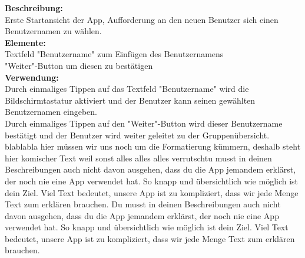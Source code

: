 \textbf{Beschreibung:}\\
Erste Startansicht der App, Aufforderung an den neuen Benutzer sich einen Benutzernamen zu wählen.\\
\textbf{Elemente:}\\
Textfeld "Benutzername" zum Einfügen des Benutzernamens\\
"Weiter"-Button um diesen zu bestätigen\\
\textbf{Verwendung:}\\
Durch einmaliges Tippen auf das Textfeld "Benutzername" wird die Bildschirmtastatur aktiviert und der Benutzer kann seinen gewählten Benutzernamen eingeben.\\
Durch einmaliges Tippen auf den "Weiter"-Button wird dieser Benutzername bestätigt und der Benutzer wird weiter geleitet zu der Gruppenübersicht.
blablabla hier müssen wir uns noch um die Formatierung kümmern, deshalb steht hier komischer Text weil sonst alles alles alles verrutschtu musst in deinen Beschreibungen auch nicht davon ausgehen, dass du die App jemandem erklärst, der noch nie eine App verwendet hat. So knapp  und übersichtlich wie möglich ist dein Ziel. Viel Text bedeutet, unsere App ist zu kompliziert, dass wir jede Menge Text zum erklären brauchen. Du musst in deinen Beschreibungen auch nicht davon ausgehen, dass du die App jemandem erklärst, der noch nie eine App verwendet hat. So knapp  und übersichtlich wie möglich ist dein Ziel. Viel Text bedeutet, unsere App ist zu kompliziert, dass wir jede Menge Text zum erklären brauchen. 
\\
\newpage

